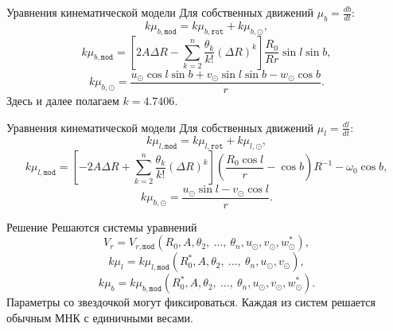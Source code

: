 \documentclass{beamer}
\begin{document}
\begin{frame}{Уравнения кинематической модели}
Для собственных движений $\mu_b = \frac{db}{dt}$:
	\begin{equation}
		k\mu_{b, \texttt{mod}} = k\mu_{b, \texttt{rot}} + k\mu_{b, \odot},
	\end{equation}
	\begin{equation}
		k\mu_{b, \texttt{mod}} = \left[ 2A\Delta R - \sum^n_{k = 2} \frac{\theta_k}{k!} \left( \Delta R \right)^k \right] \frac{R_0}{Rr} \sin{l} \sin{b},
	\end{equation}
	\begin{equation}
                k\mu_{b, \odot} = \frac{u_{\odot}\cos{l}\sin{b} + v_{\odot}\sin{l}\sin{b} - w_{\odot}\cos{b}}{r}.
	\end{equation}
        Здесь и далее полагаем $k=4.7406$.
\end{frame}

\begin{frame}{Уравнения кинематической модели}
Для собственных движений $\mu_l = \frac{dl}{dt}$:
	\begin{equation}
		k\mu_{l, \texttt{mod}} = k\mu_{l, \texttt{rot}} + k\mu_{l, \odot},
	\end{equation}
	\begin{equation}
                k\mu_{l, \texttt{mod}} = \left[ -2A\Delta R + \sum^n_{k = 2} \frac{\theta_k}{k!} \left( \Delta R \right)^k \right] \left( \frac{R_0\cos{l}}{r} - \cos{b} \right) R^{-1} - \omega_0 \cos{b},
	\end{equation}
	\begin{equation}
                k\mu_{b, \odot} = \frac{u_{\odot}\sin{l}- v_{\odot}\cos{l}}{r}.
	\end{equation}
\end{frame}

\begin{frame}{Решение}
	Решаются системы уравнений
	\begin{equation}
                V_r = V_{r, \texttt{mod}} (R_0, A, \theta_2, \:\ldots,\: \theta_n, u_{\odot}, v_{\odot}, w_{\odot}^{*}),
	\end{equation}
	\begin{equation}
                k\mu_l = k\mu_{l, \texttt{mod}} (R_0^{*}, A, \theta_2, \:\ldots,\: \theta_n, u_{\odot}, v_{\odot}),
	\end{equation}
	\begin{equation}
                k\mu_b = k\mu_{b, \texttt{mod}} (R_0^{*}, A, \theta_2, \:\ldots,\: \theta_n, u_{\odot}, v_{\odot}, w_{\odot}^{*}).
	\end{equation}
        Параметры со звездочкой могут фиксироваться. Каждая из систем решается обычным МНК с единичными весами.
\end{frame}
\end{document}

